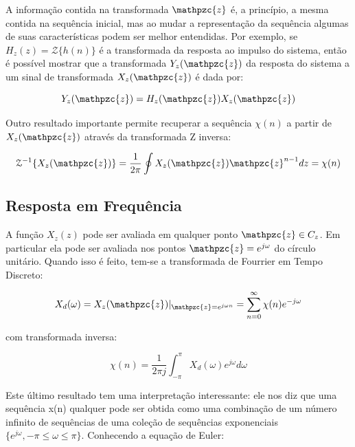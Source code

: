{A informação contida na transformada $\mathpzc{z}$ é, a princípio, a mesma contida na
sequência inicial, mas ao mudar a representação da sequência algumas de suas
características podem ser melhor entendidas. Por exemplo, se $H_z(z) = \mathcal{Z}\{h(n)\}$
é a transformada da resposta ao impulso do sistema, então é possível mostrar que
a transformada $Y_z(\mathpzc{z})$ da resposta do sistema a um sinal de transformada $X_z(\mathpzc{z})$ é
dada por:

\begin{equation}
Y_z(\mathpzc{z}) = H_z(\mathpzc{z})X_z(\mathpzc{z})
\end{equation}

Outro resultado importante permite recuperar a sequência $\chi(n)$ a partir de $X_z(\mathpzc{z})$
através da transformada Z inversa:

\begin{equation}
\mathcal{Z}^{-1}\{X_z(\mathpzc{z})\} = \frac{1}{2 \pi} \oint X_z(\mathpzc{z}) \mathpzc{z}^{n-1}dz = \chi(n)
\end{equation}

\subsection{Resposta em Frequência}

A função $X_z(z)$ pode ser avaliada em qualquer ponto $\mathpzc{z} \in C_z$. Em particular ela
pode ser avaliada nos pontos $\mathpzc{z} = e^{j\omega}$ do círculo unitário. Quando isso
é feito, tem-se a transformada de Fourrier em Tempo Discreto:

\begin{equation}
\label{eq:DFT-transform}
X_d(\omega) = X_z(\mathpzc{z})|_{\mathpzc{z} = e^{j\omega n}} = \sum _{n=0}^{\infty} \chi(n) e^{-j\omega} 
\end{equation}

com transformada inversa:

\begin{equation}
\label{eq:DFT-inverse-transform}
\chi(n) = \frac{1}{2 \pi j} \int _{- \pi}^{\pi} X_d(\omega) e^{j\omega}d\omega
\end{equation}

Este último resultado tem uma interpretação interessante: ele nos diz que uma
sequência x(n) qualquer pode ser obtida como uma combinação de um número
infinito de sequências de uma coleção de sequências exponenciais
$\{e^{j\omega}, -\pi \leq \omega \leq \pi \}$. Conhecendo a equação de Euler:

}
